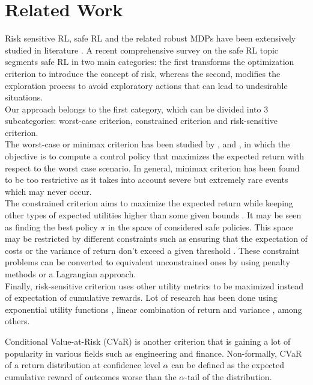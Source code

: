 \section{Related Work}

Risk sensitive RL, safe RL and the related robust MDPs have been extensively studied in 
literature \citep{Bagnell2001, Morimoto2005,Pinto2017}.
A recent comprehensive survey on the safe RL topic \citep{Garcia2015} segments safe RL
in two main categories: the first transforms
the optimization criterion to introduce the concept of risk, whereas the second, modifies
the exploration process to avoid exploratory actions that can lead to undesirable situations.\\
Our approach belongs to the first category, which can be divided into 3 subcategories: worst-case
criterion, constrained criterion and risk-sensitive criterion.\\
The worst-case or minimax criterion has been studied by \citet{Heger1994}, 
\citet{Coraluppi1997} and \citet{Coraluppi1999},
in which the objective is to compute a control policy that maximizes the expected return
with respect to the worst case scenario. In general, minimax criterion has
been found to be too restrictive as it takes into
account severe but extremely rare events which may never occur.\\
The constrained criterion  aims to maximize the expected return while keeping
other types of expected utilities higher than some given bounds \citep{Altman1993}.
It may be seen as finding the best policy $\pi$ in the space of considered safe policies.
This space may be restricted by different constraints such as ensuring that
the expectation of costs \citep{Geibel2006} or the variance of return don't exceed
a given threshold \citep{Tamar2012}.
These constraint problems can be converted to equivalent unconstrained ones by using
penalty methods or a Lagrangian approach.\\
Finally, risk-sensitive criterion uses other utility metrics to be maximized instead of
expectation of cumulative rewards.
Lot of research has been done using exponential utility functions
\citep{Howard1972,Chung1987}, linear combination
of return and variance \citep{Sato2001}, among others.

Conditional Value-at-Risk (CVaR) is another criterion that is gaining a lot of popularity in various
fields such as engineering and finance.
Non-formally, CVaR of a return distribution at confidence level $\alpha$ can be defined as the expected
cumulative reward of outcomes worse than the $\alpha$-tail of the distribution.

